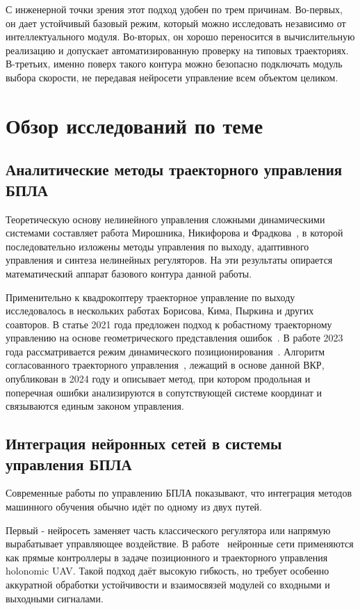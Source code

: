 С инженерной точки зрения этот подход удобен по трем причинам. Во-первых, он дает устойчивый базовый режим, который можно исследовать независимо от интеллектуального модуля. Во-вторых, он хорошо переносится в вычислительную реализацию и допускает автоматизированную проверку на типовых траекториях. В-третьих, именно поверх такого контура можно безопасно подключать модуль выбора скорости, не передавая нейросети управление всем объектом целиком.

\section{Обзор исследований по теме}

\subsection{Аналитические методы траекторного управления БПЛА}

Теоретическую основу нелинейного управления сложными динамическими системами составляет работа Мирошника, Никифорова и Фрадкова~\cite{miroshnik2000}, в которой последовательно изложены методы управления по выходу, адаптивного управления и синтеза нелинейных регуляторов.
На эти результаты опирается математический аппарат базового контура данной работы.

Применительно к квадрокоптеру траекторное управление по выходу исследовалось в нескольких работах Борисова, Кима, Пыркина и других соавторов.
В статье 2021 года предложен подход к робастному траекторному управлению на основе геометрического представления ошибок~\cite{borisov2021}. В работе 2023 года рассматривается режим динамического позиционирования~\cite{kim2023}. Алгоритм согласованного траекторного управления~\cite{kim2024article}, лежащий в основе данной ВКР, опубликован в 2024 году и описывает метод, при котором продольная и поперечная ошибки анализируются в сопутствующей системе координат и связываются единым законом управления.

\subsection{Интеграция нейронных сетей в системы управления БПЛА}

Современные работы по управлению БПЛА показывают, что интеграция методов машинного обучения обычно идёт по одному из двух путей.

Первый - нейросеть заменяет часть классического регулятора или напрямую вырабатывает управляющее воздействие.
В работе~\cite{kownacki2024} нейронные сети применяются как прямые контроллеры в задаче позиционного и траекторного управления holonomic UAV.
Такой подход даёт высокую гибкость, но требует особенно аккуратной обработки устойчивости и взаимосвязей модулей со входными и выходными сигналами.

